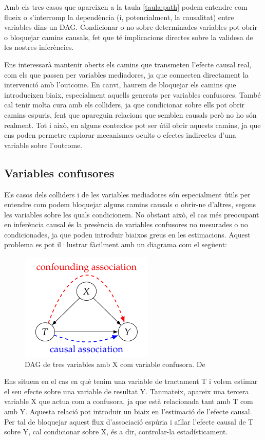 \documentclass[../main.tex]{subfiles}
\begin{document}
    Amb els tres casos que apareixen a la taula \ref{taula:path} podem entendre com flueix o s'interromp la dependència (i, potencialment, la causalitat) entre variables dins un DAG. Condicionar o no sobre determinades variables pot obrir o bloquejar camins causals, fet que té implicacions directes sobre la validesa de les nostres inferències.\par
    Ens interessarà mantenir oberts els camins que transmeten l'efecte causal real, com els que passen per variables mediadores, ja que connecten directament la intervenció amb l’outcome. En canvi, haurem de bloquejar els camins que introdueixen biaix, especialment aquells generats per variables confusores. També cal tenir molta cura amb els colliders, ja que condicionar sobre ells pot obrir camins espuris, fent que apareguin relacions que semblen causals però no ho són realment. Tot i això, en alguns contextos pot ser útil obrir aquests camins, ja que ens poden permetre explorar mecanismes ocults o efectes indirectes d’una variable sobre l’outcome.

    \subsection{Variables confusores}
    Els casos dels colliders i de les variables mediadores són especialment útils per entendre com podem bloquejar alguns camins causals o obrir-ne d’altres, segons les variables sobre les quals condicionem. No obstant això, el cas més preocupant en inferència causal és la presència de variables confusores no mesurades o no condicionades, ja que poden introduir biaixos greus en les estimacions. Aquest problema es pot il·lustrar fàcilment amb un diagrama com el següent:
    \begin{figure}[h]
        \centering        \includegraphics[width=0.3\linewidth]{imgs/confusora.png}
        \caption{DAG de tres variables amb X com variable confusora. De \cite{austin2011}}
        \label{fig:confusora}
    \end{figure}
    Ens situem en el cas en què tenim una variable de tractament T i volem estimar el seu efecte sobre una variable de resultat Y. Tanmateix, apareix una tercera variable X que actua com a confusora, ja que està relacionada tant amb T com amb Y. Aquesta relació pot introduir un biaix en l’estimació de l’efecte causal. Per tal de bloquejar aquest flux d’associació espúria i aïllar l’efecte causal de T sobre Y, cal condicionar sobre X, és a dir, controlar-la estadísticament.
    
\end{document}
